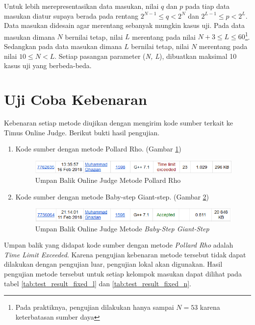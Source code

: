 Untuk lebih merepresentasikan data masukan, nilai $ q $ dan $ p $ pada tiap data masukan diatur supaya berada pada rentang $ 2^{N-1} \leq q < 2^N $ dan $ 2^{L-1} \leq p < 2^L $. Data masukan didesain agar merentang sebanyak mungkin kasus uji. Pada data masukan dimana $ N $ bernilai tetap, nilai $ L $ merentang pada nilai $ N+3 \leq L \leq 60 $\footnote{Pada praktiknya, pengujian dilakukan hanya sampai $ N = 53 $ karena keterbatasan sumber daya}. Sedangkan pada data masukan dimana $ L $ bernilai tetap, nilai $ N $ merentang pada nilai $ 10 \leq N < L $.  Setiap pasangan parameter (\textit{N, L}), dibuatkan maksimal 10 kasus uji yang berbeda-beda.

\section{Uji Coba Kebenaran}

Kebenaran setiap metode diujikan dengan mengirim kode sumber terkait ke Timus Online Judge. Berikut bukti hasil pengujian.

\begin{enumerate}
\item Kode sumber dengan metode Pollard Rho. (Gambar \ref{fig:verdict_pollard})
\begin{figure}[h!]
	\includegraphics[scale=0.6]{bab5/img/pollard-verdict}
	\caption{Umpan Balik Online Judge Metode Pollard Rho}
	\label{fig:verdict_pollard}
\end{figure}
\item Kode sumber dengan metode Baby-step Giant-step. (Gambar \ref{fig:verdict_bsgs})
\begin{figure}[h!]
	\includegraphics[scale=0.6]{bab5/img/bsgs-verdict}
	\caption{Umpan Balik Online Judge Metode \textit{Baby-Step Giant-Step}}
	\label{fig:verdict_bsgs}
\end{figure}
\end{enumerate}

Umpan balik yang didapat kode sumber dengan metode \textit{Pollard Rho} adalah \textit{Time Limit Exceeded}. Karena pengujian kebenaran metode tersebut tidak dapat dilakukan dengan pengujian luar, pengujian lokal akan digunakan. Hasil pengujian metode tersebut untuk setiap kelompok masukan dapat dilihat pada tabel \ref{tab:test_result_fixed_l} dan \ref{tab:test_result_fixed_n}.

